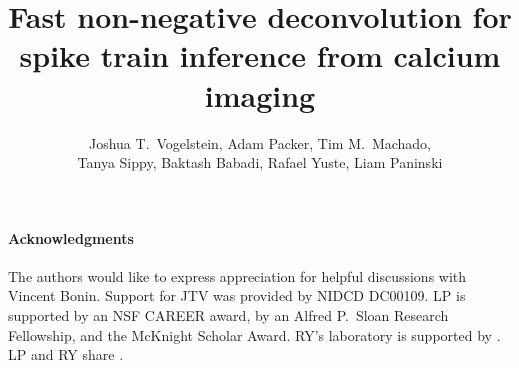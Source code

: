 
\usepackage{multicol}
\usepackage{hyperref}
\newcommand{\zzz}{z}
\newcommand{\az}{\argmin_{\bM \bC \geq \ve{0}}}
\newcommand{\anx}{\argmax_{n_t \in \mathbb{N}_0 \forall t}}
\newcommand{\ann}{\argmin_{n_t \in \mathbb{N}_0 \forall t}}
\newcommand{\foopsi}{fast }


\title{Fast non-negative deconvolution for spike train inference from calcium imaging}

\author{Joshua T.~Vogelstein, Adam Packer, Tim M.~Machado, \\ Tanya Sippy, Baktash Babadi, Rafael Yuste, Liam Paninski}



\maketitle
 









\paragraph{Acknowledgments}

The authors would like to express appreciation for helpful discussions with Vincent Bonin.  Support for JTV was provided by NIDCD DC00109. LP is supported by an NSF CAREER award, by an Alfred P.\ Sloan Research Fellowship, and the McKnight Scholar Award. RY's laboratory is supported by .  LP and RY share .


%
%

%


\appendix


% 

